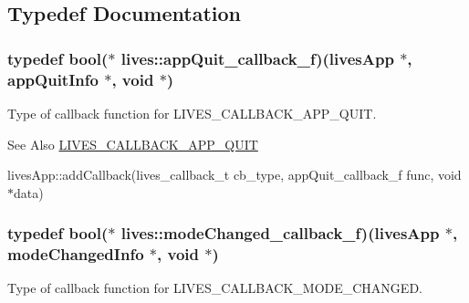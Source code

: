 \subsection{Typedef Documentation}
\hypertarget{namespacelives_a097f122e1e32156c1acc94f8987d3384}{
\subsubsection[{app\-Quit\-\_\-callback\-\_\-f}]{\setlength{\rightskip}{0pt plus 5cm}typedef bool($\ast$ lives\-::app\-Quit\-\_\-callback\-\_\-f)({\bf lives\-App} $\ast$, {\bf app\-Quit\-Info} $\ast$, void $\ast$)}}\label{namespacelives_a097f122e1e32156c1acc94f8987d3384}


Type of callback function for L\-I\-V\-E\-S\-\_\-\-C\-A\-L\-L\-B\-A\-C\-K\-\_\-\-A\-P\-P\-\_\-\-Q\-U\-I\-T. 

\begin{DoxySeeAlso}{See Also}
\hyperlink{liblives_8hpp_a61f9a031360f0a0280151f44695c2519a0a2bd8765b9404d4e01a1567b3e9a5ec}{L\-I\-V\-E\-S\-\_\-\-C\-A\-L\-L\-B\-A\-C\-K\-\_\-\-A\-P\-P\-\_\-\-Q\-U\-I\-T} 

lives\-App\-::add\-Callback(lives\-\_\-callback\-\_\-t cb\-\_\-type, app\-Quit\-\_\-callback\-\_\-f func, void $\ast$data) 
\end{DoxySeeAlso}
\hypertarget{namespacelives_a3f53f9a55851d8980f02ddc790b12720}{
\subsubsection[{mode\-Changed\-\_\-callback\-\_\-f}]{\setlength{\rightskip}{0pt plus 5cm}typedef bool($\ast$ lives\-::mode\-Changed\-\_\-callback\-\_\-f)({\bf lives\-App} $\ast$, {\bf mode\-Changed\-Info} $\ast$, void $\ast$)}}\label{namespacelives_a3f53f9a55851d8980f02ddc790b12720}


Type of callback function for L\-I\-V\-E\-S\-\_\-\-C\-A\-L\-L\-B\-A\-C\-K\-\_\-\-M\-O\-D\-E\-\_\-\-C\-H\-A\-N\-G\-E\-D. 

